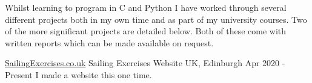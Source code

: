 
\begin{cvparagraph}
Whilst learning to program in C and Python I have worked through several different projects both in my own time and as part of my university courses. Two of the more significant projects are detailed below. Both of these come with written reports which can be made available on request.
\end{cvparagraph}

\begin{cventries}
    \cventry
        {\href{www.sailingexercises.co.uk}{SailingExercises.co.uk}}
        {Sailing Exercises Website}
        {UK, Edinburgh}
        {Apr 2020 - Present}
        {
        I made a website this one time.
        }
\end{cventries}

